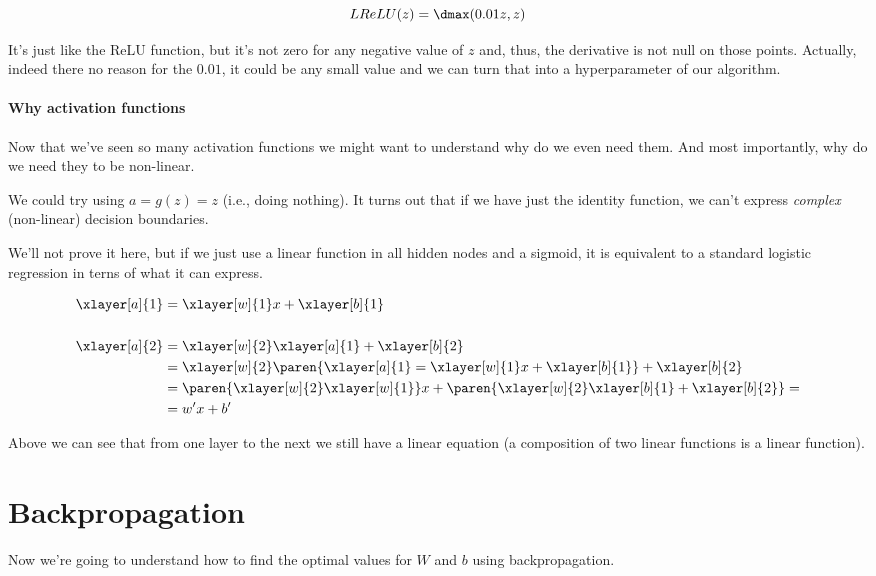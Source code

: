 \documentclass[12pt, a4paper, oneside]{book}
\begin{document}
\[
    LReLU(z) = \dmax(0.01z,z)
\]

It's just like the ReLU function, but it's not zero for any negative value of
$z$ and, thus, the derivative is not null on those points. Actually, indeed
there no reason for the $0.01$, it could be any small value and we can turn that
into a hyperparameter of our algorithm.

\paragraph{Why activation functions}%
\label{par:why_activation_functions}

Now that we've seen so many activation functions we might want to understand why
do we even need them. And most importantly, why do we need they to be
non-linear.

We could try using $a=g(z)=z$ (i.e., doing nothing). It turns out that if we
have just the identity function, we can't express \textit{complex} (non-linear)
decision boundaries.

We'll not prove it here, but if we just use a linear function in all hidden
nodes and a sigmoid, it is equivalent to a standard logistic regression in terns
of what it can express.

\begin{align*}
\xlayer[a]{1}&=\xlayer[w]{1}x+\xlayer[b]{1} \\ \\
\xlayer[a]{2}&=\xlayer[w]{2}\xlayer[a]{1}+\xlayer[b]{2} \\
             &=\xlayer[w]{2}\paren{\xlayer[a]{1}=\xlayer[w]{1}x+\xlayer[b]{1}}+
             \xlayer[b]{2} \\
             &=\paren{\xlayer[w]{2}\xlayer[w]{1}}x+
             \paren{\xlayer[w]{2}\xlayer[b]{1}+\xlayer[b]{2}}=\\
             &=w'x+b'
\end{align*}

Above we can see that from one layer to the next we still have a linear
equation (a composition of two linear functions is a linear function).

\section{Backpropagation}%
\label{sec:backpropagation}

Now we're going to understand how to find the optimal values for $W$ and $b$
using backpropagation.
\end{document}

